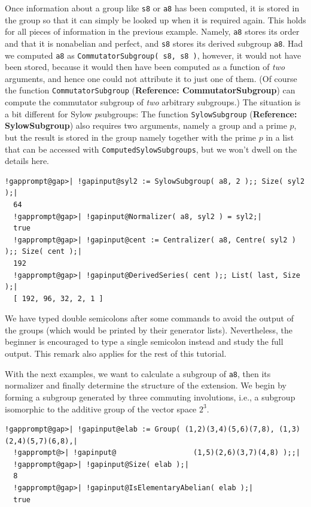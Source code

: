 \documentclass[a4paper,11pt]{report}
\begin{document}
{{ Once information about a group like \texttt{s8} or \texttt{a8} has been computed, it is stored in the group so that it can simply be looked
up when it is required again. This holds for all pieces of information in the
previous example. Namely, \texttt{a8} stores its order and that it is nonabelian and perfect, and \texttt{s8} stores its derived subgroup \texttt{a8}. Had we computed \texttt{a8} as \texttt{CommutatorSubgroup( s8, s8 )}, however, it would not have been stored, because it would then have been
computed as a function of \emph{two} arguments, and hence one could not attribute it to just one of them. (Of
course the function \texttt{CommutatorSubgroup} (\textbf{Reference: CommutatorSubgroup}) can compute the commutator subgroup of \emph{two} arbitrary subgroups.) The situation is a bit different for Sylow $p$\texttt{}subgroups: The function \texttt{SylowSubgroup} (\textbf{Reference: SylowSubgroup}) also requires two arguments, namely a group and a prime $p$, but the result is stored in the group {\textendash}namely together with the
prime $p$ in a list that can be accessed with \texttt{ComputedSylowSubgroups}, but we won't dwell on the details here. 

 
\begin{Verbatim}[commandchars=!@|,fontsize=\small,frame=single,label=Example]
  !gapprompt@gap>| !gapinput@syl2 := SylowSubgroup( a8, 2 );; Size( syl2 );|
  64
  !gapprompt@gap>| !gapinput@Normalizer( a8, syl2 ) = syl2;|
  true
  !gapprompt@gap>| !gapinput@cent := Centralizer( a8, Centre( syl2 ) );; Size( cent );|
  192
  !gapprompt@gap>| !gapinput@DerivedSeries( cent );; List( last, Size );|
  [ 192, 96, 32, 2, 1 ]
\end{Verbatim}
 

 We have typed double semicolons after some commands to avoid the output of the
groups (which would be printed by their generator lists). Nevertheless, the
beginner is encouraged to type a single semicolon instead and study the full
output. This remark also applies for the rest of this tutorial. 

 With the next examples, we want to calculate a subgroup of \texttt{a8}, then its normalizer and finally determine the structure of the extension. We
begin by forming a subgroup generated by three commuting involutions, i.e., a
subgroup isomorphic to the additive group of the vector space $2^3$. 

 
\begin{Verbatim}[commandchars=!@|,fontsize=\small,frame=single,label=Example]
  !gapprompt@gap>| !gapinput@elab := Group( (1,2)(3,4)(5,6)(7,8), (1,3)(2,4)(5,7)(6,8),|
  !gapprompt@>| !gapinput@                  (1,5)(2,6)(3,7)(4,8) );;|
  !gapprompt@gap>| !gapinput@Size( elab );|
  8
  !gapprompt@gap>| !gapinput@IsElementaryAbelian( elab );|
  true
\end{Verbatim}
 

}}
\end{document}
